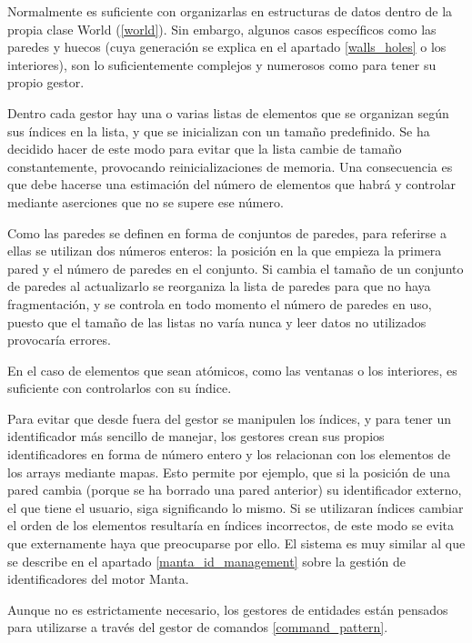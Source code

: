 Normalmente es suficiente con organizarlas en estructuras de datos dentro de la propia clase World (\ref{world}). Sin embargo, algunos casos específicos como las paredes y huecos (cuya generación se explica en el apartado \ref{walls_holes} o los interiores), son lo suficientemente complejos y numerosos como para tener su propio gestor.

Dentro cada gestor hay una o varias listas de elementos que se organizan según sus índices en la lista, y que se inicializan con un tamaño predefinido. Se ha decidido hacer de este modo para evitar que la lista cambie de tamaño constantemente, provocando reinicializaciones de memoria. Una consecuencia es que debe hacerse una estimación del número de elementos que habrá y controlar mediante aserciones que no se supere ese número. 

Como las paredes se definen en forma de conjuntos de paredes, para referirse a ellas se utilizan dos números enteros: la posición en la que empieza la primera pared y el número de paredes en el conjunto. Si cambia el tamaño de un conjunto de paredes al actualizarlo se reorganiza la lista de paredes para que no haya fragmentación, y se controla en todo momento el número de paredes en uso, puesto que el tamaño de las listas no varía nunca y leer datos no utilizados provocaría errores.

En el caso de elementos que sean atómicos, como las ventanas o los interiores, es suficiente con controlarlos con su índice.

Para evitar que desde fuera del gestor se manipulen los índices, y para tener un identificador más sencillo de manejar, los gestores crean sus propios identificadores en forma de número entero y los relacionan con los elementos de los arrays mediante mapas. Esto permite por ejemplo, que si la posición de una pared cambia (porque se ha borrado una pared anterior) su identificador externo, el que tiene el usuario, siga significando lo mismo. Si se utilizaran índices cambiar el orden de los elementos resultaría en índices incorrectos, de este modo se evita que externamente haya que preocuparse por ello. El sistema es muy similar al que se describe en el apartado \ref{manta_id_management} sobre la gestión de identificadores del motor Manta.

Aunque no es estrictamente necesario, los gestores de entidades están pensados para utilizarse a través del gestor de comandos \ref{command_pattern}.


